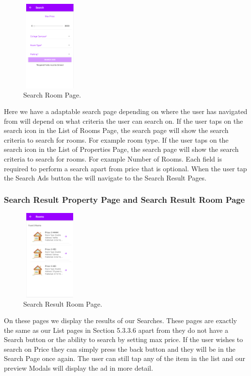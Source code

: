 \begin{figure}[h]
\centering
\includegraphics[width=2.9cm, height=4.6cm]{img/searchRoom}
\caption{Search Room Page.}
\end{figure}

Here we have a adaptable search page depending on where the user has navigated from will depend on what criteria the user can search on. If the user taps on the search icon in the List of Rooms Page, the search page will show the search criteria to search for rooms. For example room type. If the user taps on the search icon in the List of Properties Page, the search page will show the search criteria to search for rooms. For example Number of Rooms. Each field is required  to perform a search apart from price that is optional. When the user tap the Search Ads button the will navigate to the Search Result Pages.

\subsubsection{Search Result Property Page and Search Result Room Page}

\begin{figure}[h]
\centering
\includegraphics[width=2.9cm, height=4.6cm]{img/searchResult}
\caption{Search Result Room Page.}
\end{figure}

\noindent On these pages we display the results of our Searches. These pages are exactly the same as our List pages in Section 5.3.3.6 apart from they do not have a Search button or the ability to search by setting max price. If the user wishes to search on Price they can simply press the back button and they will be in the Search Page once again. The user can still tap any of the item in the list and our preview Modals will display the ad in more detail.


